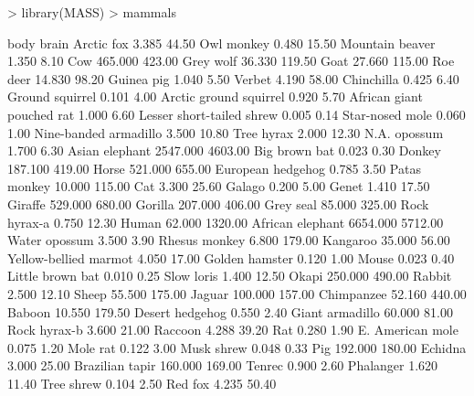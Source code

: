 \documentclass[onecolumn,11pt]{book}
\begin{document}
\begin{Schunk}
\begin{Sinput}
> library(MASS)
> mammals
\end{Sinput}
\begin{Soutput}
                              body   brain
Arctic fox                   3.385   44.50
Owl monkey                   0.480   15.50
Mountain beaver              1.350    8.10
Cow                        465.000  423.00
Grey wolf                   36.330  119.50
Goat                        27.660  115.00
Roe deer                    14.830   98.20
Guinea pig                   1.040    5.50
Verbet                       4.190   58.00
Chinchilla                   0.425    6.40
Ground squirrel              0.101    4.00
Arctic ground squirrel       0.920    5.70
African giant pouched rat    1.000    6.60
Lesser short-tailed shrew    0.005    0.14
Star-nosed mole              0.060    1.00
Nine-banded armadillo        3.500   10.80
Tree hyrax                   2.000   12.30
N.A. opossum                 1.700    6.30
Asian elephant            2547.000 4603.00
Big brown bat                0.023    0.30
Donkey                     187.100  419.00
Horse                      521.000  655.00
European hedgehog            0.785    3.50
Patas monkey                10.000  115.00
Cat                          3.300   25.60
Galago                       0.200    5.00
Genet                        1.410   17.50
Giraffe                    529.000  680.00
Gorilla                    207.000  406.00
Grey seal                   85.000  325.00
Rock hyrax-a                 0.750   12.30
Human                       62.000 1320.00
African elephant          6654.000 5712.00
Water opossum                3.500    3.90
Rhesus monkey                6.800  179.00
Kangaroo                    35.000   56.00
Yellow-bellied marmot        4.050   17.00
Golden hamster               0.120    1.00
Mouse                        0.023    0.40
Little brown bat             0.010    0.25
Slow loris                   1.400   12.50
Okapi                      250.000  490.00
Rabbit                       2.500   12.10
Sheep                       55.500  175.00
Jaguar                     100.000  157.00
Chimpanzee                  52.160  440.00
Baboon                      10.550  179.50
Desert hedgehog              0.550    2.40
Giant armadillo             60.000   81.00
Rock hyrax-b                 3.600   21.00
Raccoon                      4.288   39.20
Rat                          0.280    1.90
E. American mole             0.075    1.20
Mole rat                     0.122    3.00
Musk shrew                   0.048    0.33
Pig                        192.000  180.00
Echidna                      3.000   25.00
Brazilian tapir            160.000  169.00
Tenrec                       0.900    2.60
Phalanger                    1.620   11.40
Tree shrew                   0.104    2.50
Red fox                      4.235   50.40
\end{Soutput}
\end{Schunk}
\end{document}
